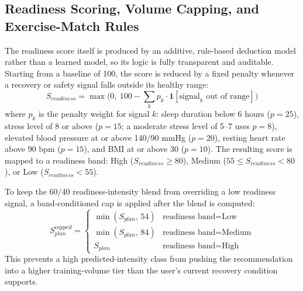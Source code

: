 \documentclass{aitthesis}
\begin{document}
\subsection{Readiness Scoring, Volume Capping, and Exercise-Match Rules}
\label{sec:readiness_scoring}

The readiness score itself is produced by an additive, rule-based deduction model rather than a learned model, so its logic is fully transparent and auditable. Starting from a baseline of 100, the score is reduced by a fixed penalty whenever a recovery or safety signal falls outside its healthy range:
\begin{equation}
S_{readiness}=\max\Big(0,\ 100-\sum_{k}p_k\cdot\mathbf{1}[\text{signal}_k\text{ out of range}]\Big)
\end{equation}
where $p_k$ is the penalty weight for signal $k$: sleep duration below 6 hours ($p=25$), stress level of 8 or above ($p=15$; a moderate stress level of 5--7 uses $p=8$), elevated blood pressure at or above 140/90 mmHg ($p=20$), resting heart rate above 90 bpm ($p=15$), and BMI at or above 30 ($p=10$). The resulting score is mapped to a readiness band: High ($S_{readiness}\geq80$), Medium ($55\leq S_{readiness}<80$), or Low ($S_{readiness}<55$).

To keep the 60/40 readiness-intensity blend from overriding a low readiness signal, a band-conditioned cap is applied after the blend is computed:
\begin{equation}
S_{plan}^{capped}=
\begin{cases}
\min(S_{plan},\,54) & \text{readiness band}=\text{Low} \\
\min(S_{plan},\,84) & \text{readiness band}=\text{Medium} \\
S_{plan} & \text{readiness band}=\text{High}
\end{cases}
\end{equation}
This prevents a high predicted-intensity class from pushing the recommendation into a higher training-volume tier than the user's current recovery condition supports.
\end{document}
